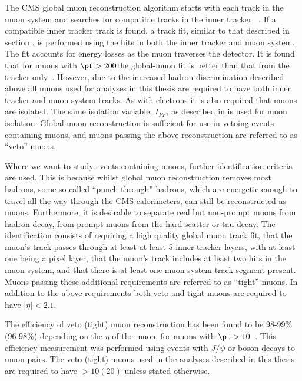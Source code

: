 The CMS global muon reconstruction algorithm starts with each track in the muon system and searches for compatible tracks in the inner tracker ~\cite{MuonReco}. If a compatible inner tracker track is found, a track fit, similar to that described in section , is performed using the hits in both the inner tracker and muon system. The fit accounts for energy losses as the muon traverses the detector. It is found that for muons with $\pt>200$\GeV the global-muon fit is better than that from the tracker only~\cite{MuonReco}. However, due to the increased hadron discrimination described above all muons used for analyses in this thesis are required to have both inner tracker and muon system tracks. As with electrons it is also required that muons are isolated. The same isolation variable, $I_{PF}$, as described in  is used for muon isolation. Global muon reconstruction is sufficient for use in vetoing events containing muons, and muons passing the above reconstruction are referred to as ``veto'' muons.

Where we want to study events containing muons, further identification criteria are used. This is because whilst global muon reconstruction removes most hadrons, some so-called ``punch through'' hadrons, which are energetic enough to travel all the way through the CMS calorimeters, can still be reconstructed as muons. Furthermore, it is desirable to separate real but non-prompt muons from hadron decay, from prompt muons from the hard scatter or tau decay. The identification consists of requiring a high quality global muon track fit, that the muon's track passes through at least at least 5 inner tracker layers, with at least one being a pixel layer, that the muon's track includes at least two hits in the muon system, and that there is at least one muon system track segment present. Muons passing these additional requirements are referred to as ``tight'' muons. In addition to the above requirements both veto and tight muons are required to have $|\eta|<2.1$.

The efficiency of veto (tight) muon reconstruction has been found to be 98-99\% (96-98\%) depending on the $\eta$ of the muon, for muons with $\pt>10$\GeV~\cite{MuonReco}. This efficiency measurement was performed using events with $J/\psi$ or \PZ boson decays to muon pairs. The veto (tight) muons used in the analyses described in this thesis are required to have \pt$>10 (20)$ \GeV unless stated otherwise.


